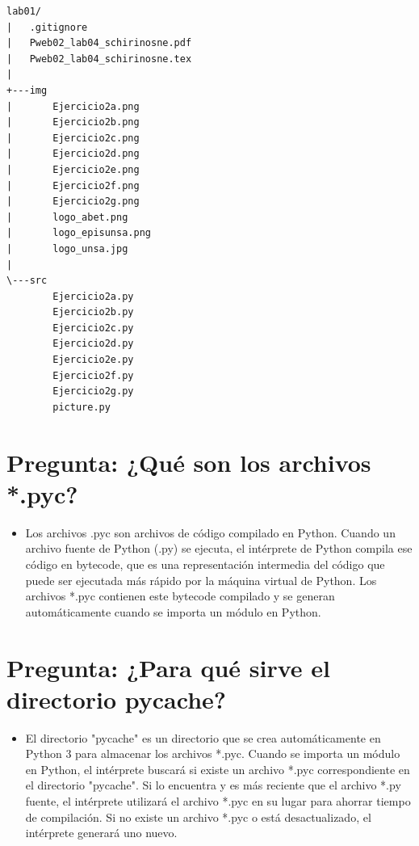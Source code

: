 \documentclass{article}
\begin{document}
\begin{lstlisting}[style=ascii-tree]
lab01/
|   .gitignore
|   Pweb02_lab04_schirinosne.pdf
|   Pweb02_lab04_schirinosne.tex
|
+---img
|       Ejercicio2a.png
|       Ejercicio2b.png
|       Ejercicio2c.png
|       Ejercicio2d.png
|       Ejercicio2e.png
|       Ejercicio2f.png
|       Ejercicio2g.png
|       logo_abet.png
|       logo_episunsa.png
|       logo_unsa.jpg
|
\---src
        Ejercicio2a.py
        Ejercicio2b.py
        Ejercicio2c.py
        Ejercicio2d.py
        Ejercicio2e.py
        Ejercicio2f.py
        Ejercicio2g.py
        picture.py
\end{lstlisting}    

\section{Pregunta: ¿Qué son los archivos *.pyc?}
	\begin{itemize}
		\item Los archivos .pyc son archivos de código compilado en Python. Cuando un archivo fuente de Python (.py) se ejecuta, el intérprete de Python compila ese código en bytecode, que es una representación intermedia del código que puede ser ejecutada más rápido por la máquina virtual de Python. Los archivos *.pyc contienen este bytecode compilado y se generan automáticamente cuando se importa un módulo en Python.
	\end{itemize}	
	\section{Pregunta: ¿Para qué sirve el directorio pycache?}
	\begin{itemize}
		\item El directorio "pycache" es un directorio que se crea automáticamente en Python 3 para almacenar los archivos *.pyc. Cuando se importa un módulo en Python, el intérprete buscará si existe un archivo *.pyc correspondiente en el directorio "pycache". Si lo encuentra y es más reciente que el archivo *.py fuente, el intérprete utilizará el archivo *.pyc en su lugar para ahorrar tiempo de compilación. Si no existe un archivo *.pyc o está desactualizado, el intérprete generará uno nuevo.
	\end{itemize}	
\end{document}

